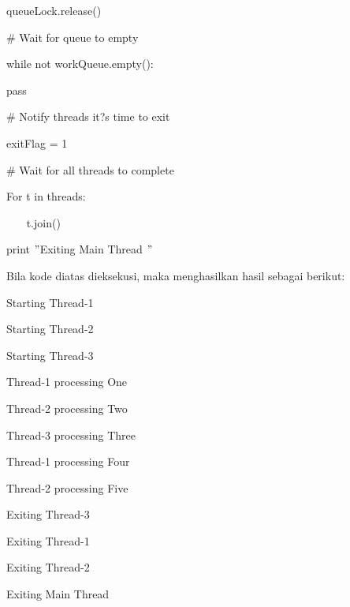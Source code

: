 \noindent 
{\fontsize{10pt}{10pt}\selectfont queueLock.release()} \par
\vspace{10pt}
\noindent 
{\fontsize{10pt}{10pt}\selectfont  $  \#  $ Wait for queue to empty} \par
\noindent 
{\fontsize{10pt}{10pt}\selectfont while not workQueue.empty():} \par
\noindent 
{\fontsize{10pt}{10pt}\selectfont pass} \par
\vspace{10pt}
\noindent 
{\fontsize{10pt}{10pt}\selectfont  $  \#  $ Notify threads it?s time to exit} \par
\noindent 
{\fontsize{10pt}{10pt}\selectfont exitFlag = 1} \par
\vspace{10pt}
\noindent 
{\fontsize{10pt}{10pt}\selectfont  $  \#  $ Wait for all threads to complete} \par
\noindent 
{\fontsize{10pt}{10pt}\selectfont For t in threads:} \par
\noindent 
{\fontsize{10pt}{10pt}\selectfont ~~~ t.join()} \par
\noindent 
{\fontsize{10pt}{10pt}\selectfont print  $ " $Exiting Main Thread $ " $} \par
\vspace{10pt}
\noindent 
Bila kode diatas dieksekusi, maka menghasilkan hasil sebagai berikut: \par
\vspace{12pt}
\noindent 
{\fontsize{10pt}{10pt}\selectfont Starting Thread-1} \par
\noindent 
{\fontsize{10pt}{10pt}\selectfont Starting Thread-2} \par
\noindent 
{\fontsize{10pt}{10pt}\selectfont Starting Thread-3} \par
\noindent 
{\fontsize{10pt}{10pt}\selectfont Thread-1 processing One} \par
\noindent 
{\fontsize{10pt}{10pt}\selectfont Thread-2 processing Two} \par
\noindent 
{\fontsize{10pt}{10pt}\selectfont Thread-3 processing Three} \par
\noindent 
{\fontsize{10pt}{10pt}\selectfont Thread-1 processing Four} \par
\noindent 
{\fontsize{10pt}{10pt}\selectfont Thread-2 processing Five} \par
\noindent 
{\fontsize{10pt}{10pt}\selectfont Exiting Thread-3} \par
\noindent 
{\fontsize{10pt}{10pt}\selectfont Exiting Thread-1} \par
\noindent 
{\fontsize{10pt}{10pt}\selectfont Exiting Thread-2} \par
\noindent 
{\fontsize{10pt}{10pt}\selectfont Exiting Main Thread} \par
\vspace{12pt}